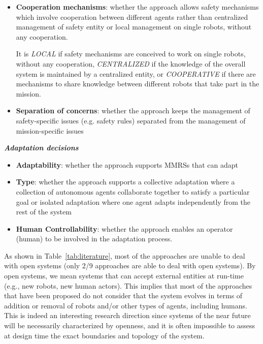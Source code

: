 \documentclass[journal]{IEEEtran}
\theoremstyle{definition}
\begin{document}
\begin{itemize}
\item \textbf{Cooperation mechanisms}: whether the approach allows safety mechanisms which involve cooperation between different agents rather than centralized management of safety entity or local management on
single robots, without any cooperation.

It is \textit{LOCAL} if safety mechanisms are conceived to work  on
single robots, without any cooperation,
\textit{CENTRALIZED} if the knowledge
of the overall system is maintained by a centralized entity,
or \textit{COOPERATIVE} if there are mechanisms to share knowledge between different robots that take part in the
mission.

\item \textbf{Separation of concerns}: whether the approach keeps the management of safety-specific issues (e.g. safety rules)  separated from the management of mission-specific issues
\end{itemize}

\textbf{\textit{Adaptation decisions}} 
\begin{itemize}
    

\item \textbf{Adaptability}: whether the approach supports MMRSs that can adapt
\item \textbf{Type}: whether the approach supports a collective adaptation where a collection of autonomous agents collaborate together to satisfy a particular goal or isolated adaptation where one agent adapts independently from the rest of the system
\item \textbf{Human Controllability}: whether the approach enables an operator (human) to be involved in the adaptation process. 
\end{itemize}


As shown in Table~\ref{tab:literature}, most of the approaches are unable to deal with open systems (only 2/9 approaches are able to deal with open systems).  By open systems, we mean systems that can accept external entities at run-time (e.g.,  new robots,  new human actors).   This implies that  most  of the  approaches  that  have  been  proposed do not consider that the system evolves in terms of addition or removal of robots and/or other types of agents, including humans.  This is indeed an interesting research direction since  systems of the near future will be necessarily characterized by openness, and it is often impossible to assess at design time the exact boundaries and topology of the system.
\end{document}
